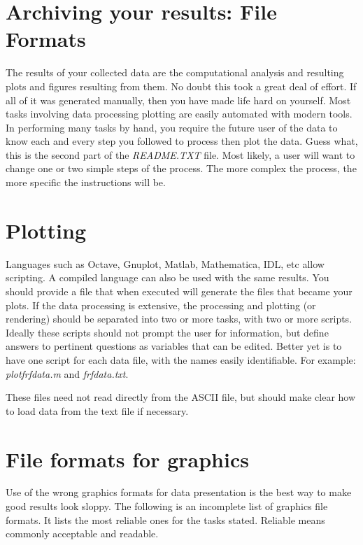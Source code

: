 \documentclass[a4paper]{article}
\begin{document}
\section{Archiving your results: File Formats%
  \label{archiving-your-results-file-formats}%
}

The results of your collected data are the computational analysis and
resulting plots and figures resulting from them. No doubt this took a
great deal of effort. If all of it was generated manually, then you have
made life hard on yourself. Most tasks involving data processing
plotting are easily automated with modern tools. In performing many
tasks by hand, you require the future user of the data to know each and
every step you followed to process then plot the data. Guess what, this
is the second part of the \emph{README.TXT} file. Most likely, a user will want
to change one or two simple steps of the process. The more complex the
process, the more specific the instructions will be.


\section{Plotting%
  \label{plotting}%
}

Languages such as Octave, Gnuplot, Matlab, Mathematica, IDL, etc allow
scripting. A compiled language can also be used with the same results.
You should provide a file that when executed will generate the files
that became your plots. If the data processing is extensive, the
processing and plotting (or rendering) should be separated into two or
more tasks, with two or more scripts. Ideally these scripts should not
prompt the user for information, but define answers to pertinent
questions as variables that can be edited. Better yet is to have one
script for each data file, with the names easily identifiable. For
example: \emph{plotfrfdata.m} and \emph{frfdata.txt}.

These files need not read directly from the ASCII file, but should make
clear how to load data from the text file if necessary.


\section{File formats for graphics%
  \label{file-formats-for-graphics}%
}

Use of the wrong graphics formats for data presentation is the best way
to make good results look sloppy. The following is an incomplete list of
graphics file formats. It lists the most reliable ones for the tasks
stated. Reliable means commonly acceptable and readable.
\end{document}
